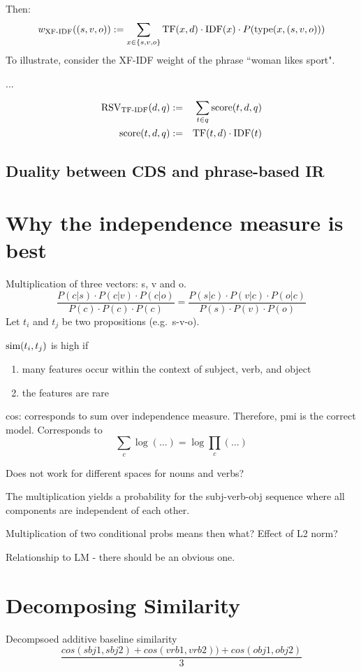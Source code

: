 Then:
\[
w_\textmd{XF-IDF}((s,v,o)) :=
\sum_{x \in \{s,v,o\}} \textmd{TF}(x,d) \cdot \textmd{IDF}(x) \cdot P(\textmd{type}(x,(s,v,o)))
\]
To illustrate, consider the XF-IDF weight of the phrase ``woman likes sport".

...

\begin{eqnarray}
\label{tf-idf-phrase}
\textmd{RSV}_\textmd{TF-IDF}(d,q) &:=& \sum_{t \in q} \textmd{score}(t,d,q)\\
\textmd{score}(t,d,q) &:=&
\textmd{TF}(t,d) \cdot \textmd{IDF}(t)
\end{eqnarray}



\subsection{Duality between CDS and phrase-based IR}



\section{Why the independence measure is best}

Multiplication of three vectors: s, v and o.
\[
\frac{
P(c|s) \cdot P(c|v) \cdot P(c|o)}{
P(c) \cdot P(c) \cdot P(c)} =
\frac{
P(s|c) \cdot P(v|c) \cdot P(o|c)
}{
P(s) \cdot P(v) \cdot P(o)
}
\]
Let $t_i$ and $t_j$ be two propositions
(e.g.~s-v-o).

$\textmd{sim}(t_i,t_j)$ is high if
\begin{enumerate}
\item many features occur within the context of subject, verb, and object
\item the features are rare
\end{enumerate}

cos: corresponds to sum over independence measure.
Therefore, pmi is the correct model.
Corresponds to
\[
\sum_c \log(...) = \log \prod_c(...)
\]



Does not work for different
spaces for nouns and verbs?

The multiplication yields a probability
for the subj-verb-obj sequence where all
components are independent of each other.

Multiplication of two conditional probs means then what?
Effect of L2 norm?


Relationship to LM - there should be an obvious one.


\section{Decomposing Similarity}
Decompsoed additive baseline similarity
\[
\frac{cos(sbj1,sbj2) + cos(vrb1,vrb2)) + cos(obj1,obj2)}{3}
\]

